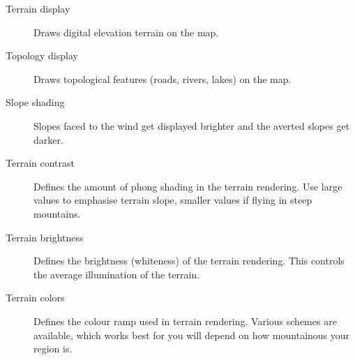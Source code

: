 \begin{description}
\item[Terrain display]  Draws digital elevation terrain on the map.
\item[Topology display]  Draws topological features (roads, rivers, lakes) on
the map.
\item[Slope shading]  \label{conf:shading} Slopes faced to the wind get
displayed brighter and the averted slopes get darker.
\item[Terrain contrast]  Defines the amount of phong shading in the terrain rendering.  Use large values 
to emphasise terrain slope, smaller values if flying in steep mountains.
\item[Terrain brightness]  Defines the brightness (whiteness) of the terrain rendering.  This controls the 
average illumination of the terrain.
\item[Terrain colors]  Defines the colour ramp used in terrain rendering.  Various schemes are available, 
which works best for you will depend on how mountainous your region is.
\end{description}



